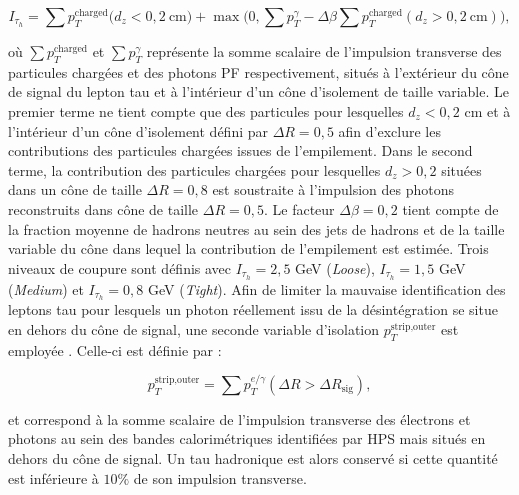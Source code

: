\begin{equation*}
    I_{\tau_h}=\sum p_T^{\text{charged}}\bigl(d_z<0,2~\mbox{cm})+\max(0,\sum p_T^{\gamma}-\Delta\beta\sum p_T^{\text{charged}}(d_z>0,2~\mbox{cm})\bigr),
\end{equation*}

où $\sum p_T^{\text{charged}}$ et $\sum p_T^{\gamma}$ représente la somme scalaire de l'impulsion transverse des particules chargées et des photons PF respectivement, situés à l'extérieur du cône de signal du lepton tau et à l'intérieur d'un cône d'isolement de taille variable. Le premier terme ne tient compte que des particules pour lesquelles $d_z<0,2$ cm et à l'intérieur d'un cône d'isolement défini par $\Delta R=0,5$ afin d'exclure les contributions des particules chargées issues de l'empilement. Dans le second terme, la contribution des particules chargées pour lesquelles $d_z>0,2$ situées dans un cône de taille $\Delta R=0,8$ est soustraite à l'impulsion des photons reconstruits dans cône de taille $\Delta R=0,5$. Le facteur $\Delta\beta=0,2$ tient compte de la fraction moyenne de hadrons neutres au sein des jets de hadrons et de la taille variable du cône dans lequel la contribution de l'empilement est estimée. Trois niveaux de coupure sont définis avec $I_{\tau_h}=2,5$ GeV (\textit{Loose}), $I_{\tau_h}=1,5$ GeV (\textit{Medium}) et $I_{\tau_h}=0,8$ GeV (\textit{Tight}). Afin de limiter la mauvaise identification des leptons tau pour lesquels un photon réellement issu de la désintégration se situe en dehors du cône de signal, une seconde variable d'isolation $p_T^{\text{strip,outer}}$ est employée \cite{taureco}. Celle-ci est définie par :

\begin{equation}
    p_T^{\text{strip,outer}}=\sum p_T^{e/\gamma}(\Delta R>\Delta R_{\text{sig}}),     
\end{equation}

\vskip 0.1cm

et correspond à la somme scalaire de l'impulsion transverse des électrons et photons au sein des bandes calorimétriques identifiées par HPS mais situés en dehors du cône de signal. Un tau hadronique est alors conservé si cette quantité est inférieure à $10\%$ de son impulsion transverse. \\

